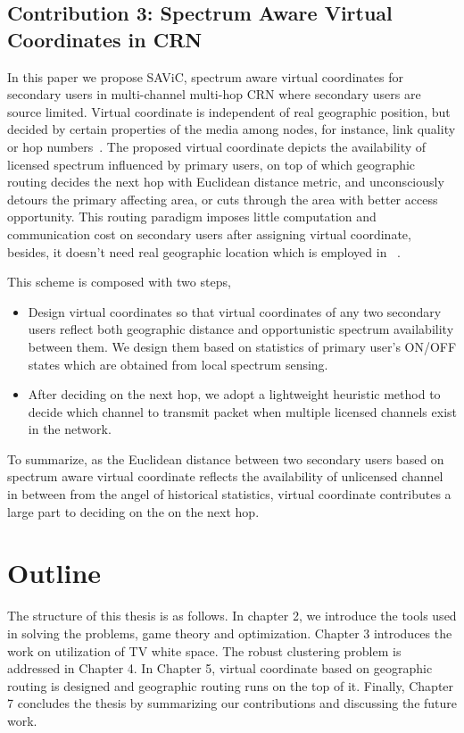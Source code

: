 \subsection*{Contribution 3: Spectrum Aware Virtual Coordinates in CRN}


In this paper we propose SAViC, spectrum aware virtual coordinates for secondary users in multi-channel multi-hop CRN where secondary users are source limited.
Virtual coordinate is independent of real geographic position, but decided by certain properties of the media among nodes, for instance, link quality or hop numbers~\cite{gpsfree05infocom}.
The proposed virtual coordinate depicts the availability of licensed spectrum influenced by primary users, on top of which geographic routing decides the next hop with Euclidean distance metric, and unconsciously detours the primary affecting area, or cuts through the area with better access opportunity.
This routing paradigm imposes little computation and communication cost on secondary users after assigning virtual coordinate, besides, it doesn't need real geographic location which is employed in ~\cite{search_geo_routing_chowdhury, routing-crn-jsac12}.

This scheme is composed with two steps,
\begin{itemize}
\item Design virtual coordinates so that virtual coordinates of any two secondary users reflect both geographic distance and opportunistic spectrum availability between them.
We design them based on statistics of primary user’s ON/OFF states which are obtained from local spectrum sensing.

\item After deciding on the next hop, we adopt a lightweight heuristic method to decide which channel to transmit packet when multiple licensed channels exist in the network.


\end{itemize}

To summarize, as the Euclidean distance between two secondary users based on spectrum aware virtual coordinate reflects the availability of unlicensed channel in between from the angel of historical statistics, virtual coordinate contributes a large part to deciding on the on the next hop. 











\section{Outline}
The structure of this thesis is as follows.
In chapter 2, we introduce the tools used in solving the problems, \ie game theory and optimization. 
Chapter 3 introduces the work on utilization of TV white space.
The robust clustering problem is addressed in Chapter 4.
In Chapter 5, virtual coordinate based on geographic routing is designed and geographic routing runs on the top of it.
Finally, Chapter 7 concludes the thesis by summarizing our contributions and discussing the future work.




